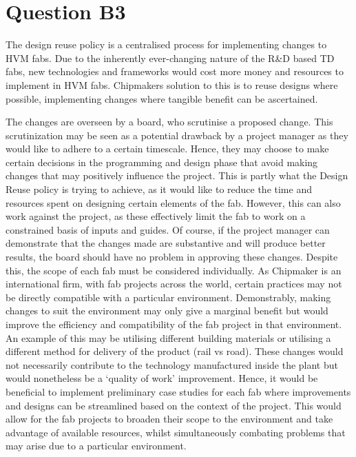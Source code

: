 \documentclass[11pt]{article}
\begin{document}
\section*{Question B3}
The design reuse policy is a centralised process for implementing changes to HVM fabs. Due to the inherently ever-changing nature of the R\&D based TD fabs, new technologies and frameworks would cost more money and resources to implement in HVM fabs. Chipmakers solution to this is to reuse designs where possible, implementing changes where tangible benefit can be ascertained. 

The changes are overseen by a board, who scrutinise a proposed change. This scrutinization may be seen as a potential drawback by a project manager as they would like to adhere to a certain timescale. Hence, they may choose to make certain decisions in the programming and design phase that avoid making changes that may positively influence the project. This is partly what the Design Reuse policy is trying to achieve, as it would like to reduce the time and resources spent on designing certain elements of the fab. However, this can also work against the project, as these effectively limit the fab to work on a constrained basis of inputs and guides. Of course, if the project manager can demonstrate that the changes made are substantive and will produce better results, the board should have no problem in approving these changes. Despite this, the scope of each fab must be considered individually. As Chipmaker is an international firm, with fab projects across the world, certain practices may not be directly compatible with a particular environment. Demonstrably, making changes to suit the environment may only give a marginal benefit but would improve the efficiency and compatibility of the fab project in that environment. An example of this may be utilising different building materials or utilising a different method for delivery of the product (rail vs road). These changes would not necessarily contribute to the technology manufactured inside the plant but would nonetheless be a `quality of work' improvement. Hence, it would be beneficial to implement preliminary case studies for each fab where improvements and designs can be streamlined based on the context of the project. This would allow for the fab projects to broaden their scope to the environment and take advantage of available resources, whilst simultaneously combating problems that may arise due to a particular environment. 
\end{document}
